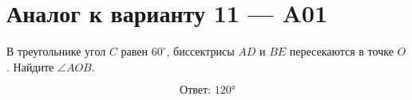 


\section*{Аналог к варианту 11 — A01}
В треугольнике угол \(C\) равен \(60^\circ\), биссектрисы \(AD\) и \(BE\) пересекаются в точке \(O\). Найдите \(\angle AOB\).
\begin{center}\end{center}
\[\boxed{\text{Ответ: }120°}\]

